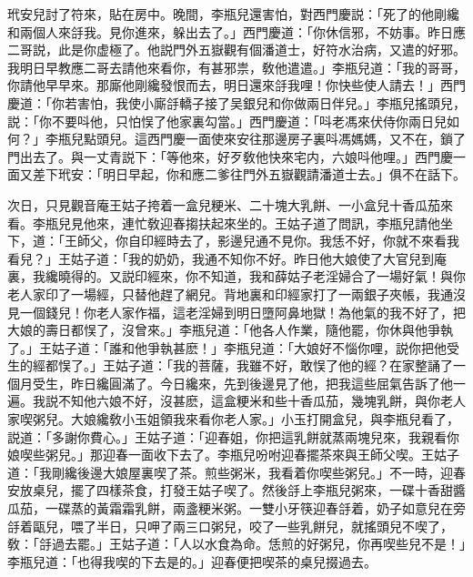 玳安兒討了符來，貼在房中。晚間，李瓶兒還害怕，對西門慶説：「死了的他剛纔和兩個人來㧱我。見你進來，躲出去了。」西門慶道：「你休信邪，不妨事。昨日應二哥説，此是你虚極了。他説門外五嶽觀有個潘道士，好符水治病，又遣的好邪。我明日早教應二哥去請他來看你，有甚邪祟，敎他遣遣。」李瓶兒道：「我的哥哥，你請他早早來。那廝他剛纔發恨而去，明日還來㧱我哩！你快些使人請去！」西門慶道：「你若害怕，我使小廝㧱轎子接了吴銀兒和你做兩日伴兒。」李瓶兒搖頭兒，説：「你不要呌他，只怕悮了他家裏勾當。」西門慶道：「呌老馮來伏侍你兩日兒如何？」李瓶兒點頭兒。這西門慶一面使來安往那邊房子裏呌馮媽媽，又不在，鎖了門出去了。與一丈青説下：「等他來，好歹敎他快來宅内，六娘呌他哩。」西門慶一面又差下玳安：「明日早起，你和應二爹往門外五嶽觀請潘道士去。」俱不在話下。

次日，只見觀音庵王姑子挎着一盒兒粳米、二十塊大乳餅、一小盒兒十香瓜茄來看。李瓶兒見他來，連忙敎迎春搊扶起來坐的。王姑子道了問訊，李瓶兒請他坐下，道：「王師父，你自印經時去了，影邊兒通不見你。我恁不好，你就不來看我看兒？」王姑子道：「我的奶奶，我通不知你不好。昨日他大娘使了大官兒到庵裏，我纔曉得的。又説印經來，你不知道，我和薛姑子老淫婦合了一場好氣！與你老人家印了一場經，只替他趕了網兒。背地裏和印經家打了一兩銀子夾帳，我通沒見一個錢兒！你老人家作福，這老淫婦到明日墮阿鼻地獄！為他氣的我不好了，把大娘的壽日都悮了，沒曾來。」李瓶兒道：「他各人作業，隨他罷，你休與他爭執了。」王姑子道：「誰和他爭執甚麽！」李瓶兒道：「大娘好不惱你哩，説你把他受生的經都悮了。」王姑子道：「我的菩薩，我雖不好，敢悮了他的經？在家整誦了一個月受生，昨日纔圓滿了。今日纔來，先到後邊見了他，把我這些屈氣告訴了他一遍。我説不知他六娘不好，沒甚麽，這盒粳米和些十香瓜茄，幾塊乳餅，與你老人家喫粥兒。大娘纔敎小玉姐領我來看你老人家。」小玉打開盒兒，與李瓶兒看了，説道：「多謝你費心。」王姑子道：「迎春姐，你把這乳餅就蒸兩塊兒來，我親看你娘喫些粥兒。」那迎春一面收下去了。李瓶兒吩咐迎春擺茶來與王師父喫。王姑子道：「我剛纔後邊大娘屋裏喫了茶。煎些粥米，我看着你喫些粥兒。」不一時，迎春安放桌兒，擺了四樣茶食，打發王姑子喫了。然後㧱上李瓶兒粥來，一碟十香甜醬瓜茄，一碟蒸的黃霜霜乳餅，兩盞粳米粥。一雙小牙筷迎春㧱着，奶子如意兒在旁㧱着甌兒，喂了半日，只呷了兩三口粥兒，咬了一些乳餅兒，就搖頭兒不喫了，敎：「㧱過去罷。」王姑子道：「人以水食為命。恁煎的好粥兒，你再喫些兒不是！」李瓶兒道：「也得我喫的下去是的。」迎春便把喫茶的桌兒掇過去。


